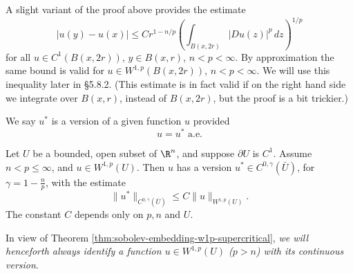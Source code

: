 \begin{remark}
\label{rem:morrey-estimate-on-ball}
A slight variant of the proof above provides the estimate
$$|u(y) - u(x)| \le Cr^{1-n/p} \left( \int_{B(x,2r)} |Du(z)|^p\,dz \right)^{1/p}$$
for all $u \in C^1(B(x, 2r))$, $y \in B(x, r)$, $n < p < \infty$. By approximation the same bound is valid for $u \in W^{1,p}(B(x, 2r))$, $n < p < \infty$. We will use this inequality later in §5.8.2. (This estimate is in fact valid if on the right hand side we integrate over $B(x, r)$, instead of $B(x, 2r)$, but the proof is a bit trickier.)
\end{remark}

\begin{definition}
\label{def:version-of-a-function}
We say $u^*$ is a version of a given function $u$ provided
$$u = u^* \text{ a.e.}$$
\end{definition}

\begin{theorem}
\label{thm:sobolev-embedding-w1p-supercritical}
Let $U$ be a bounded, open subset of $\R^n$, and suppose $\partial U$ is $C^1$. Assume $n < p \le \infty$, and $u \in W^{1,p}(U)$. Then $u$ has a version $u^* \in C^{0,\gamma}(\bar{U})$, for $\gamma = 1 - \frac{n}{p}$, with the estimate
$$\|u^*\|_{C^{0,\gamma}(\bar{U})} \le C\|u\|_{W^{1,p}(U)}.$$
The constant $C$ depends only on $p, n$ and $U$.
\end{theorem}

\begin{remark}
\label{rem:identify-continuous-version}
In view of Theorem \ref{thm:sobolev-embedding-w1p-supercritical}, \textit{we will henceforth always identify a function $u \in W^{1,p}(U)$ ($p > n$) with its continuous version}.
\end{remark}

